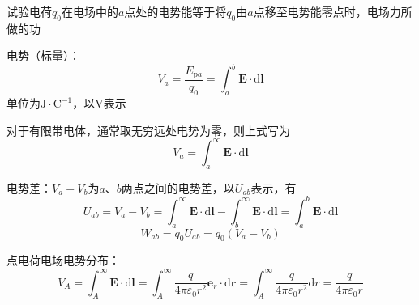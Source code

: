 \documentclass[12pt, a4paper, twoside]{ctexbook}
\begin{document}
试验电荷$q_0$在电场中的$a$点处的电势能等于将$q_0$由$a$点移至电势能零点时，电场力所做的功

{\sonti 电势（标量）}：
$$
V_a=\frac{E_{\mathrm{p}a}}{q_0}=\int_{a}^{b} \boldsymbol{E}\cdot\mathrm{d}\boldsymbol{l}
$$
单位为$\mathrm{J}\cdot\mathrm{C}^{-1}$，以$\mathrm{V}$表示

对于有限带电体，通常取无穷远处电势为零，则上式写为
$$
V_a=\int_{a}^{\infty} \boldsymbol{E}\cdot\mathrm{d}\boldsymbol{l}
$$

{\sonti 电势差}：$V_a-V_b$为$a$、$b$两点之间的电势差，以$U_{ab}$表示，有
$$
U_{ab}=V_a-V_b=\int_{a}^{\infty} \boldsymbol{E}\cdot\mathrm{d}\boldsymbol{l}-\int_{b}^{\infty} \boldsymbol{E}\cdot\mathrm{d}\boldsymbol{l}=\int_{a}^{b} \boldsymbol{E}\cdot\mathrm{d}\boldsymbol{l}
$$
$$
W_{ab}=q_0U_{ab}=q_0\left(V_a-V_b\right)
$$

{\sonti 点电荷电场电势分布}：
$$
V_A=\int_{A}^{\infty} \boldsymbol{E}\cdot\mathrm{d}\boldsymbol{l}=\int_{A}^{\infty}\frac{q}{4\pi\varepsilon_0r^2}\boldsymbol{e}_r\cdot\mathrm{d}\boldsymbol{r}=\int_{A}^{\infty}\frac{q}{4\pi\varepsilon_0r^2}\mathrm{d}r=\frac{q}{4\pi\varepsilon_0r}
$$
\end{document}

